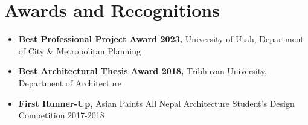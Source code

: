 \section{ \textbf{ Awards and Recognitions}}
    \begin{itemize}[leftmargin=0.15in]
    	\item{\textbf{Best Professional Project Award 2023, }{University of Utah, Department of City \& Metropolitan Planning}} \\
        \item{\textbf{Best Architectural Thesis Award 2018, }{Tribhuvan University, Department of Architecture}} \\
        \item{\textbf{First Runner-Up, }{Asian Paints All Nepal Architecture Student’s Design Competition 2017-2018}}
    \end{itemize}
